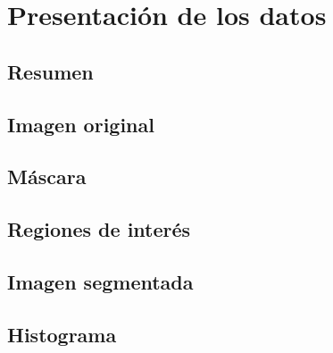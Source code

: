 \section{Presentación de los datos}

\subsection{Resumen}

\subsection{Imagen original}

\subsection{Máscara}

\subsection{Regiones de interés}

\subsection{Imagen segmentada}

\subsection{Histograma}
\cite{LindermanDgz}